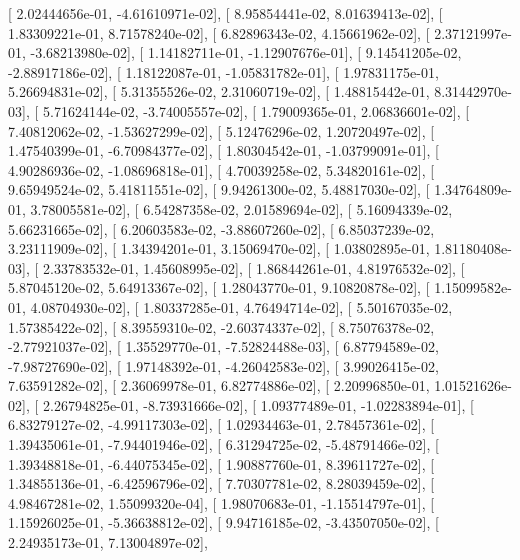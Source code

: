 \documentclass{article}
\begin{document}
       [  2.02444656e-01,  -4.61610971e-02],
       [  8.95854441e-02,   8.01639413e-02],
       [  1.83309221e-01,   8.71578240e-02],
       [  6.82896343e-02,   4.15661962e-02],
       [  2.37121997e-01,  -3.68213980e-02],
       [  1.14182711e-01,  -1.12907676e-01],
       [  9.14541205e-02,  -2.88917186e-02],
       [  1.18122087e-01,  -1.05831782e-01],
       [  1.97831175e-01,   5.26694831e-02],
       [  5.31355526e-02,   2.31060719e-02],
       [  1.48815442e-01,   8.31442970e-03],
       [  5.71624144e-02,  -3.74005557e-02],
       [  1.79009365e-01,   2.06836601e-02],
       [  7.40812062e-02,  -1.53627299e-02],
       [  5.12476296e-02,   1.20720497e-02],
       [  1.47540399e-01,  -6.70984377e-02],
       [  1.80304542e-01,  -1.03799091e-01],
       [  4.90286936e-02,  -1.08696818e-01],
       [  4.70039258e-02,   5.34820161e-02],
       [  9.65949524e-02,   5.41811551e-02],
       [  9.94261300e-02,   5.48817030e-02],
       [  1.34764809e-01,   3.78005581e-02],
       [  6.54287358e-02,   2.01589694e-02],
       [  5.16094339e-02,   5.66231665e-02],
       [  6.20603583e-02,  -3.88607260e-02],
       [  6.85037239e-02,   3.23111909e-02],
       [  1.34394201e-01,   3.15069470e-02],
       [  1.03802895e-01,   1.81180408e-03],
       [  2.33783532e-01,   1.45608995e-02],
       [  1.86844261e-01,   4.81976532e-02],
       [  5.87045120e-02,   5.64913367e-02],
       [  1.28043770e-01,   9.10820878e-02],
       [  1.15099582e-01,   4.08704930e-02],
       [  1.80337285e-01,   4.76494714e-02],
       [  5.50167035e-02,   1.57385422e-02],
       [  8.39559310e-02,  -2.60374337e-02],
       [  8.75076378e-02,  -2.77921037e-02],
       [  1.35529770e-01,  -7.52824488e-03],
       [  6.87794589e-02,  -7.98727690e-02],
       [  1.97148392e-01,  -4.26042583e-02],
       [  3.99026415e-02,   7.63591282e-02],
       [  2.36069978e-01,   6.82774886e-02],
       [  2.20996850e-01,   1.01521626e-02],
       [  2.26794825e-01,  -8.73931666e-02],
       [  1.09377489e-01,  -1.02283894e-01],
       [  6.83279127e-02,  -4.99117303e-02],
       [  1.02934463e-01,   2.78457361e-02],
       [  1.39435061e-01,  -7.94401946e-02],
       [  6.31294725e-02,  -5.48791466e-02],
       [  1.39348818e-01,  -6.44075345e-02],
       [  1.90887760e-01,   8.39611727e-02],
       [  1.34855136e-01,  -6.42596796e-02],
       [  7.70307781e-02,   8.28039459e-02],
       [  4.98467281e-02,   1.55099320e-04],
       [  1.98070683e-01,  -1.15514797e-01],
       [  1.15926025e-01,  -5.36638812e-02],
       [  9.94716185e-02,  -3.43507050e-02],
       [  2.24935173e-01,   7.13004897e-02],
\end{document}
